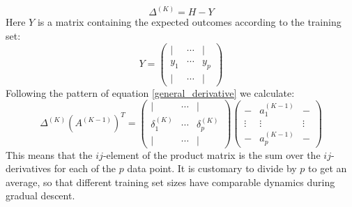 \documentclass[12pt, a4paper]{article}
\numberwithin{equation}{section}
\begin{document}
\begin{equation}
\Delta^{(K)}=H-Y
\end{equation}
Here $Y$ is a matrix containing the expected outcomes according to the training set:
\begin{equation}
Y=
\begin{pmatrix}
|	&	\cdots	& |	\\
y_1	&	\cdots	& y_p \\
|	&	\cdots	& |
\end{pmatrix}
\end{equation}
Following the pattern of equation \ref{general_derivative} we calculate:
\begin{equation}
\Delta^{(K)}\left(A^{(K-1)}\right)^T=\begin{pmatrix}
|	&	\cdots	& |	\\
\delta^{(K)}_1	&	\cdots	& \delta^{(K)}_p \\
|	&	\cdots	& |
\end{pmatrix}
\begin{pmatrix}
-	& a^{(K-1)}_1	&	- \\
\vdots	& \vdots	& \vdots \\
-	& a^{(K-1)}_p	&	-
\end{pmatrix}
\end{equation}
This means that the $ij$-element of the product matrix is the sum over the $ij$-derivatives for each of the $p$ data point. It is customary to divide by $p$ to get an average, so that different training set sizes have comparable dynamics during gradual descent.
\end{document}
